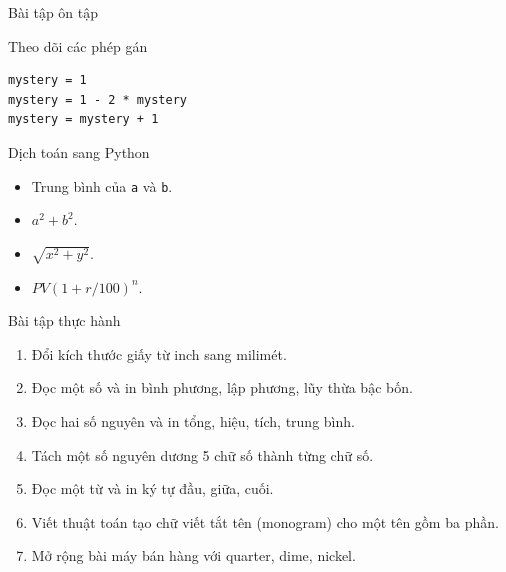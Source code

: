 \documentclass[aspectratio=169,10pt]{beamer}
\begin{document}
\begin{frame}[fragile]{Bài tập ôn tập}
\small
\begin{block}{Theo dõi các phép gán}
\begin{lstlisting}
mystery = 1
mystery = 1 - 2 * mystery
mystery = mystery + 1
\end{lstlisting}
\end{block}
\begin{block}{Dịch toán sang Python}
\begin{itemize}
  \item Trung bình của \texttt{a} và \texttt{b}.
  \item $a^2+b^2$.
  \item $\sqrt{x^2+y^2}$.
  \item $PV(1+r/100)^n$.
\end{itemize}
\end{block}
\end{frame}

\begin{frame}{Bài tập thực hành}
\small
\begin{enumerate}
  \item Đổi kích thước giấy từ inch sang milimét.
  \item Đọc một số và in bình phương, lập phương, lũy thừa bậc bốn.
  \item Đọc hai số nguyên và in tổng, hiệu, tích, trung bình.
  \item Tách một số nguyên dương 5 chữ số thành từng chữ số.
  \item Đọc một từ và in ký tự đầu, giữa, cuối.
  \item Viết thuật toán tạo chữ viết tắt tên (monogram) cho một tên gồm ba phần.
  \item Mở rộng bài máy bán hàng với quarter, dime, nickel.
\end{enumerate}
\end{frame}
\end{document}
